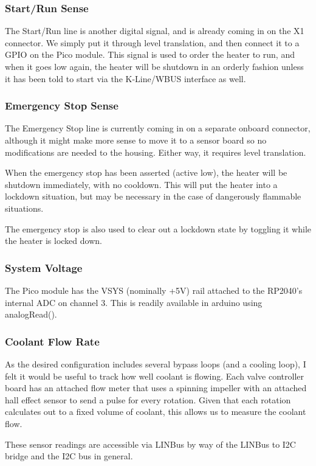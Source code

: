 \documentclass[lettersize,journal]{IEEEtran}
\begin{document}
\subsubsection{Start/Run Sense}
The Start/Run line is another digital signal, and is already coming in on the X1 connector.  We simply put it through level translation, and then connect it to a GPIO on the Pico module.  This signal is used to order the heater to run, and when it goes low again, the heater will be shutdown in an orderly fashion unless it has been told to start via the K-Line/WBUS interface as well.

\subsubsection{Emergency Stop Sense}
The Emergency Stop line is currently coming in on a separate onboard connector, although it might make more sense to move it to a sensor board so no modifications are needed to the housing.  Either way, it requires level translation.

When the emergency stop has been asserted (active low), the heater will be shutdown immediately, with no cooldown.  This will put the heater into a lockdown situation, but may be necessary in the case of dangerously flammable situations.

The emergency stop is also used to clear out a lockdown state by toggling it while the heater is locked down.

\subsubsection{System Voltage}
The Pico module has the VSYS (nominally +5V) rail attached to the RP2040's internal ADC on channel 3.  This is readily available in arduino using analogRead().

\subsubsection{Coolant Flow Rate}
As the desired configuration includes several bypass loops (and a cooling loop), I felt it would be useful to track how well coolant is flowing.  Each valve controller board has an attached flow meter that uses a spinning impeller with an attached hall effect sensor to send a pulse for every rotation.  Given that each rotation calculates out to a fixed volume of coolant, this allows us to measure the coolant flow.

These sensor readings are accessible via LINBus by way of the LINBus to I2C bridge and the I2C bus in general.
\end{document}
